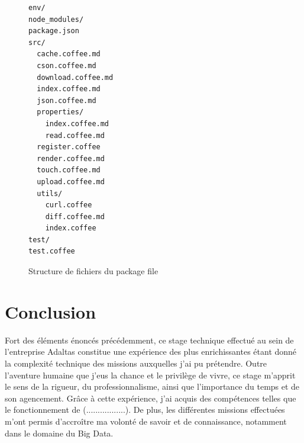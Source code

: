 \documentclass[12pt, french]{report}
\begin{document}
\begin{figure}[h]
\begin{verbatim}
env/
node_modules/
package.json
src/
  cache.coffee.md
  cson.coffee.md
  download.coffee.md
  index.coffee.md
  json.coffee.md
  properties/
    index.coffee.md
    read.coffee.md
  register.coffee
  render.coffee.md
  touch.coffee.md
  upload.coffee.md
  utils/
    curl.coffee
    diff.coffee.md
    index.coffee
test/
test.coffee
\end{verbatim}
\centering
\caption{Structure de fichiers du package file}
\label{fig:fileStructure}
\end{figure}

\chapter*{Conclusion}

Fort des éléments énoncés précédemment, ce stage technique effectué au sein de l’entreprise Adaltas constitue une expérience des plus enrichissantes étant donné la complexité technique des missions auxquelles j'ai pu prétendre. Outre l’aventure humaine que j’eus la chance et le privilège de vivre, ce stage m’apprit le sens de la rigueur, du professionnalisme, ainsi que l’importance du temps et de son agencement. Grâce à cette expérience, j’ai acquis des compétences telles que le fonctionnement de (.................). De plus, les différentes missions effectuées m’ont permis d’accroître ma volonté de savoir et de connaissance, notamment dans le domaine du Big Data.

\clearpage

\printglossaries
\end{document}
